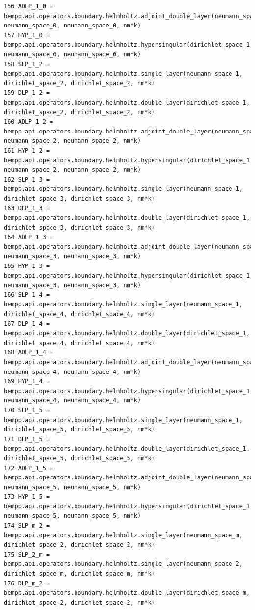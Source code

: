 \documentclass[12pt,letterpaper]{article}
\numberwithin{equation}{section}
\begin{document}
\begin{lstlisting}
156 ADLP_1_0 = bempp.api.operators.boundary.helmholtz.adjoint_double_layer(neumann_space_1, neumann_space_0, neumann_space_0, nm*k)
157 HYP_1_0 = bempp.api.operators.boundary.helmholtz.hypersingular(dirichlet_space_1, neumann_space_0, neumann_space_0, nm*k)
158 SLP_1_2 = bempp.api.operators.boundary.helmholtz.single_layer(neumann_space_1, dirichlet_space_2, dirichlet_space_2, nm*k)
159 DLP_1_2 = bempp.api.operators.boundary.helmholtz.double_layer(dirichlet_space_1, dirichlet_space_2, dirichlet_space_2, nm*k)
160 ADLP_1_2 = bempp.api.operators.boundary.helmholtz.adjoint_double_layer(neumann_space_1, neumann_space_2, neumann_space_2, nm*k)
161 HYP_1_2 = bempp.api.operators.boundary.helmholtz.hypersingular(dirichlet_space_1, neumann_space_2, neumann_space_2, nm*k)
162 SLP_1_3 = bempp.api.operators.boundary.helmholtz.single_layer(neumann_space_1, dirichlet_space_3, dirichlet_space_3, nm*k)
163 DLP_1_3 = bempp.api.operators.boundary.helmholtz.double_layer(dirichlet_space_1, dirichlet_space_3, dirichlet_space_3, nm*k)
164 ADLP_1_3 = bempp.api.operators.boundary.helmholtz.adjoint_double_layer(neumann_space_1, neumann_space_3, neumann_space_3, nm*k)
165 HYP_1_3 = bempp.api.operators.boundary.helmholtz.hypersingular(dirichlet_space_1, neumann_space_3, neumann_space_3, nm*k)
166 SLP_1_4 = bempp.api.operators.boundary.helmholtz.single_layer(neumann_space_1, dirichlet_space_4, dirichlet_space_4, nm*k)
167 DLP_1_4 = bempp.api.operators.boundary.helmholtz.double_layer(dirichlet_space_1, dirichlet_space_4, dirichlet_space_4, nm*k)
168 ADLP_1_4 = bempp.api.operators.boundary.helmholtz.adjoint_double_layer(neumann_space_1, neumann_space_4, neumann_space_4, nm*k)
169 HYP_1_4 = bempp.api.operators.boundary.helmholtz.hypersingular(dirichlet_space_1, neumann_space_4, neumann_space_4, nm*k)
170 SLP_1_5 = bempp.api.operators.boundary.helmholtz.single_layer(neumann_space_1, dirichlet_space_5, dirichlet_space_5, nm*k)
171 DLP_1_5 = bempp.api.operators.boundary.helmholtz.double_layer(dirichlet_space_1, dirichlet_space_5, dirichlet_space_5, nm*k)
172 ADLP_1_5 = bempp.api.operators.boundary.helmholtz.adjoint_double_layer(neumann_space_1, neumann_space_5, neumann_space_5, nm*k)
173 HYP_1_5 = bempp.api.operators.boundary.helmholtz.hypersingular(dirichlet_space_1, neumann_space_5, neumann_space_5, nm*k)
174 SLP_m_2 = bempp.api.operators.boundary.helmholtz.single_layer(neumann_space_m, dirichlet_space_2, dirichlet_space_2, nm*k)
175 SLP_2_m = bempp.api.operators.boundary.helmholtz.single_layer(neumann_space_2, dirichlet_space_m, dirichlet_space_m, nm*k)
176 DLP_m_2 = bempp.api.operators.boundary.helmholtz.double_layer(dirichlet_space_m, dirichlet_space_2, dirichlet_space_2, nm*k)

\end{lstlisting}
\end{document}
